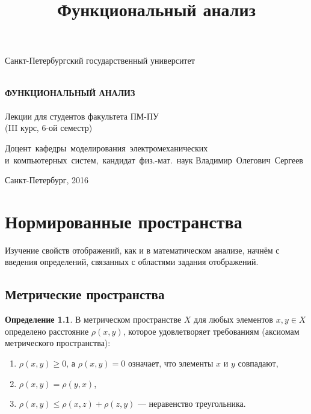 \documentclass[12pt,a4paper,titlepage, oneside]{book}
\title{Функциональный анализ}
\theoremstyle{definition}
\newtheorem*{definition}{Определение}
\theoremstyle{plain}
\theoremstyle{remark}
\theoremstyle{remark}
\theoremstyle{remark}
\theoremstyle{plain}
\theoremstyle{plain}
\begin{document}
\begin{titlepage}

\begin{center}
\vfill
\framepage

Санкт-Петербургский государственный университет\\
\ \\

\vfill

{\large\bf ФУНКЦИОНАЛЬНЫЙ АНАЛИЗ\\}
\ \\
Лекции для студентов факультета ПМ-ПУ\\
(III курс, 6-ой семестр)

\vfill

\hfill\vbox
{
\hbox{Доцент кафедры моделирования электромеханических}
\hbox{и компьютерных систем, кандидат физ.-мат. наук}
\hbox{Владимир Олегович Сергеев}
}

\vfill

Санкт-Петербург, 2016
\end{center}

\end{titlepage}

\tableofcontents

\chapter{Нормированные пространства}

Изучение свойств отображений, как и в математическом анализе, начнём с введения определений, связанных с областями задания отображений.

\section{Метрические пространства}

\begin{definition}
В метрическом пространстве $X$ для любых элементов $x, y \in X$ определено расстояние $\rho(x, y)$, которое удовлетворяет требованиям (аксиомам метрического пространства):
\begin{enumerate}

	\item $\rho(x, y)\geqslant 0$, а $\rho(x, y)=0$ означает, что элементы $x$ и $y$ совпадают,

	\item $\rho(x, y)=\rho(y, x)$,

	\item $ \rho(x, y)\leqslant \rho(x, z) +\rho(z, y)$ --- неравенство треугольника.
	
\end{enumerate}
\end{definition}
\end{document}
